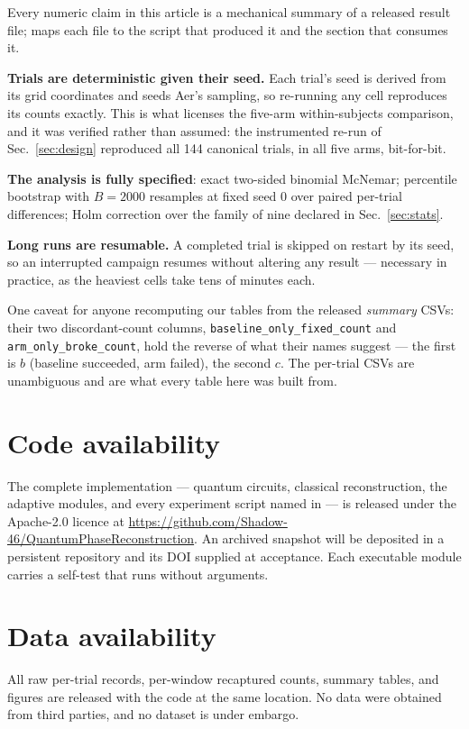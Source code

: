 Every numeric claim in this article is a mechanical summary of a released
result file; \SIartifacts{} maps each file to the script that produced it
and the section that consumes it.

\textbf{Trials are deterministic given their seed.} Each trial's seed is
derived from its grid coordinates and seeds Aer's sampling, so re-running
any cell reproduces its counts exactly. This is what licenses the five-arm
within-subjects comparison, and it was verified rather than assumed: the
instrumented re-run of Sec.~\ref{sec:design} reproduced all 144 canonical
trials, in all five arms, bit-for-bit.

\textbf{The analysis is fully specified}: exact two-sided binomial McNemar;
percentile bootstrap with $B=2000$ resamples at fixed seed 0 over paired
per-trial differences; Holm correction over the family of nine declared in
Sec.~\ref{sec:stats}.

\textbf{Long runs are resumable.} A completed trial is skipped on restart by
its seed, so an interrupted campaign resumes without altering any result ---
necessary in practice, as the heaviest cells take tens of minutes each.

One caveat for anyone recomputing our tables from the released \emph{summary}
CSVs: their two discordant-count columns,
\texttt{baseline\_only\_fixed\_count} and \texttt{arm\_only\_broke\_count},
hold the reverse of what their names suggest --- the first is $b$ (baseline
succeeded, arm failed), the second $c$. The per-trial CSVs are unambiguous
and are what every table here was built from.

\section*{Code availability}
The complete implementation --- quantum circuits, classical reconstruction,
the adaptive modules, and every experiment script named in \SIartifacts{} ---
is released under the Apache-2.0 licence at
\url{https://github.com/Shadow-46/QuantumPhaseReconstruction}. An archived
snapshot will be deposited in a persistent repository and its DOI supplied
at acceptance. Each executable module carries a self-test that runs without
arguments.

\section*{Data availability}
All raw per-trial records, per-window recaptured counts, summary tables, and
figures are released with the code at the same location. No data were
obtained from third parties, and no dataset is under embargo.

